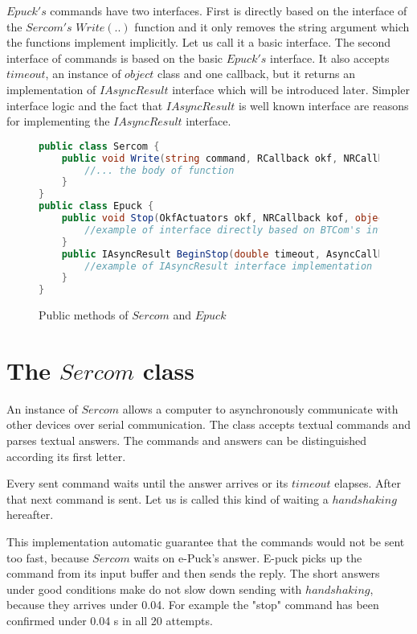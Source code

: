 	$Epuck's$ commands have two interfaces. First is directly based on the interface of 
	the $Sercom's$ $Write(..)$ function and it only removes the string argument which the functions
	implement implicitly.
	Let us call it a basic interface.
	The second interface of commands is based on the basic $Epuck's$ interface. 
	It also accepts $timeout$, an instance of $object$ class and one callback, but it returns 
	an implementation of $IAsyncResult$ interface which will be introduced later.
	Simpler interface logic	and the fact that $IAsyncResult$ is well known interface
	are reasons for implementing the $IAsyncResult$ interface.

\begin{figure}[!hbp]
\begin{lstlisting}[language=cs]
public class Sercom {
	public void Write(string command, RCallback okf, NRCallback kof,object state, double timeout) {
		//... the body of function
	}
}
public class Epuck {
	public void Stop(OkfActuators okf, NRCallback kof, object state, double timeout) {
		//example of interface directly based on BTCom's interface
	}
	public IAsyncResult BeginStop(double timeout, AsyncCallback callback, Object state) {
		//example of IAsyncResult interface implementation
	}
}
\end{lstlisting}
\caption{Public methods of $Sercom$ and $Epuck$} \label{serep}
\end{figure}
\section{The $Sercom$ class}\label{sec:sercom}
	An instance of $Sercom$ allows a computer to asynchronously communicate with other devices
	over serial communication. The class accepts textual commands and parses textual answers.
	The commands and answers can be distinguished according its first letter.
	
	Every sent command waits until the answer arrives or its $timeout$ elapses.
	After that next command is sent. Let us is called this kind of waiting a $handshaking$ hereafter.

	This implementation automatic guarantee that the commands would not be sent too fast,
	because $Sercom$ waits on e-Puck's answer. E-puck picks up the command from its input buffer and then sends the reply.
	The short answers under good conditions make do not slow down sending with $handshaking$, because
	they arrives under 0.04. For example the "stop" command has been confirmed under 0.04 s in all 20 attempts.

